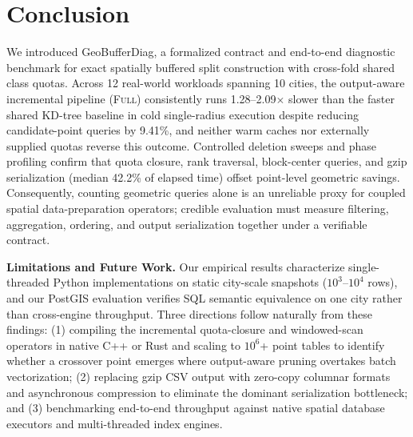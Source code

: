 \documentclass[sigconf, nonacm]{acmart}
\newcommand{\sys}{GeoBufferDiag}
\newcommand{\full}{\textsc{Full}}
\begin{document}
\section{Conclusion}
We introduced \sys, a formalized contract and end-to-end diagnostic benchmark for exact spatially buffered split construction with cross-fold shared class quotas. Across 12 real-world workloads spanning 10 cities, the output-aware incremental pipeline (\full) consistently runs 1.28--2.09$\times$ slower than the faster shared KD-tree baseline in cold single-radius execution despite reducing candidate-point queries by 9.41\%, and neither warm caches nor externally supplied quotas reverse this outcome. Controlled deletion sweeps and phase profiling confirm that quota closure, rank traversal, block-center queries, and gzip serialization (median 42.2\% of elapsed time) offset point-level geometric savings. Consequently, counting geometric queries alone is an unreliable proxy for coupled spatial data-preparation operators; credible evaluation must measure filtering, aggregation, ordering, and output serialization together under a verifiable contract.

\textbf{Limitations and Future Work.} Our empirical results characterize single-threaded Python implementations on static city-scale snapshots ($10^3$--$10^4$ rows), and our PostGIS evaluation verifies SQL semantic equivalence on one city rather than cross-engine throughput. Three directions follow naturally from these findings: (1) compiling the incremental quota-closure and windowed-scan operators in native C++ or Rust and scaling to $10^6$+ point tables to identify whether a crossover point emerges where output-aware pruning overtakes batch vectorization; (2) replacing gzip CSV output with zero-copy columnar formats and asynchronous compression to eliminate the dominant serialization bottleneck; and (3) benchmarking end-to-end throughput against native spatial database executors and multi-threaded index engines.



\end{document}
